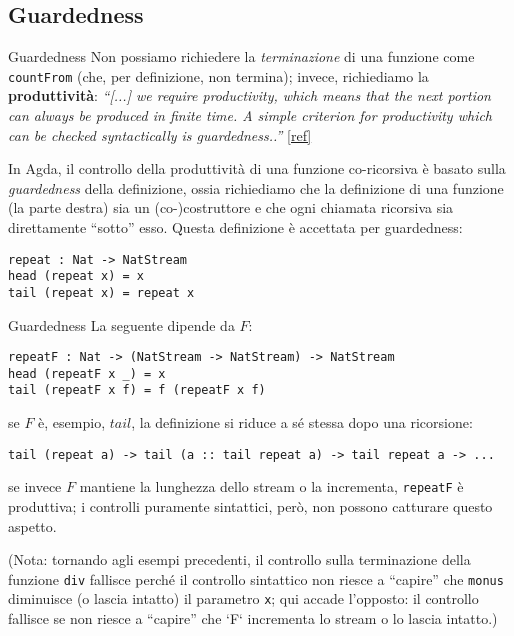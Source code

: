 \documentclass[t,aspectratio=169,10pt]{beamer}
\begin{document}
\subsection{Guardedness}
\begin{frame}[fragile]{Guardedness}
	Non possiamo richiedere la {\it terminazione} di una funzione come
	\texttt{countFrom} (che, per definizione, non termina);
	invece, richiediamo la {\bf produttività}: \textit{``[...]
	we require productivity, which means that the next portion can always be
	produced in finite time. A simple criterion for productivity which can be
	checked syntactically is guardedness..''}
	\href{https://arxiv.org/pdf/1012.4896.pdf}{[ref]}

	\vfill

	In Agda, il controllo della produttività di una funzione co-ricorsiva è basato
	sulla {\it guardedness} della definizione, ossia richiediamo che la definizione di
	una funzione (la parte destra) sia un (co-)costruttore e che ogni chiamata
	ricorsiva sia direttamente ``sotto'' esso. Questa definizione è accettata per
	guardedness:
	\begin{verbatim}
repeat : Nat -> NatStream
head (repeat x) = x 
tail (repeat x) = repeat x
\end{verbatim}
\end{frame}
\begin{frame}[fragile]{Guardedness}
	La seguente dipende da $F$:

	\begin{verbatim}
repeatF : Nat -> (NatStream -> NatStream) -> NatStream
head (repeatF x _) = x 
tail (repeatF x f) = f (repeatF x f)
\end{verbatim}

	se $F$ è, esempio, $tail$, la definizione si riduce a sé stessa dopo una ricorsione:

	\begin{verbatim}
tail (repeat a) -> tail (a :: tail repeat a) -> tail repeat a -> ...
\end{verbatim}
	se invece $F$ mantiene la lunghezza dello stream o la incrementa,
	\texttt{repeatF} è produttiva; i controlli puramente sintattici, però, non
	possono catturare questo aspetto.

	(Nota: tornando agli esempi precedenti, il controllo sulla terminazione della
	funzione \texttt{div} fallisce perché il controllo sintattico non riesce a
	``capire'' che \texttt{monus} diminuisce (o lascia intatto) il parametro
	\texttt{x}; qui accade l'opposto: il controllo fallisce se non riesce a
	``capire'' che `F` incrementa lo stream o lo lascia intatto.)
\end{frame}
\end{document}
